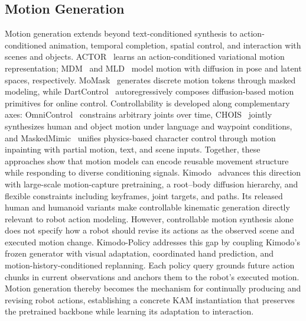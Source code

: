 \subsection{Motion Generation}
\label{sec:related_motion_generation}
Motion generation extends beyond text-conditioned synthesis to action-conditioned animation, temporal completion, spatial control, and interaction with scenes and objects. ACTOR~\citep{actor} learns an action-conditioned variational motion representation; MDM~\citep{mdm} and MLD~\citep{mld} model motion with diffusion in pose and latent spaces, respectively. MoMask~\citep{momask} generates discrete motion tokens through masked modeling, while DartControl~\citep{dartcontrol} autoregressively composes diffusion-based motion primitives for online control. Controllability is developed along complementary axes: OmniControl~\citep{omnicontrol} constrains arbitrary joints over time, CHOIS~\citep{chois} jointly synthesizes human and object motion under language and waypoint conditions, and MaskedMimic~\citep{maskedmimic} unifies physics-based character control through motion inpainting with partial motion, text, and scene inputs. Together, these approaches show that motion models can encode reusable movement structure while responding to diverse conditioning signals. Kimodo~\citep{kimodo} advances this direction with large-scale motion-capture pretraining, a root--body diffusion hierarchy, and flexible constraints including keyframes, joint targets, and paths. Its released human and humanoid variants make controllable kinematic generation directly relevant to robot action modeling. However, controllable motion synthesis alone does not specify how a robot should revise its actions as the observed scene and executed motion change. Kimodo-Policy addresses this gap by coupling Kimodo's frozen generator with visual adaptation, coordinated hand prediction, and motion-history-conditioned replanning. Each policy query grounds future action chunks in current observations and anchors them to the robot's executed motion. Motion generation thereby becomes the mechanism for continually producing and revising robot actions, establishing a concrete KAM instantiation that preserves the pretrained backbone while learning its adaptation to interaction.
\par
\endgroup
